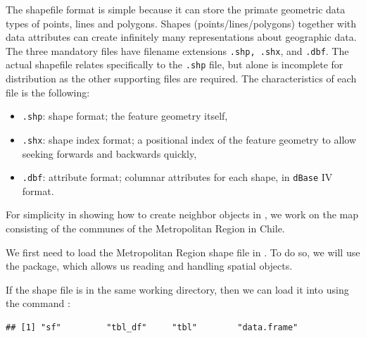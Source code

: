 The shapefile format is simple because it can store the primate geometric data types of points, lines and polygons. Shapes (points/lines/polygons) together with data attributes can create infinitely many representations about geographic data. The three mandatory files have filename extensions \texttt{.shp, .shx}, and \texttt{.dbf}. The actual shapefile relates specifically to the \texttt{.shp} file, but alone is incomplete for distribution as the other supporting files are required. The characteristics of each file is the following:

\begin{itemize}
  \item \texttt{.shp}: shape format; the feature geometry itself,
  \item \texttt{.shx}: shape index format; a positional index of the feature geometry to allow seeking forwards and backwards quickly,
  \item \texttt{.dbf}: attribute format; columnar attributes for each shape, in \texttt{dBase} IV format. 
\end{itemize}

For simplicity in showing how to create neighbor objects in , we work on the map consisting of the communes of the Metropolitan Region in Chile. 

We first need to load the Metropolitan Region shape file in . To do so, we will use the  package, which allows us reading and handling spatial objects. 

\begin{knitrout}
\color{fgcolor}\begin{kframe}
\begin{alltt}
\hlstd{(}\hlstd{)}
\end{alltt}
\end{kframe}
\end{knitrout}

If the shape file  is in the same working directory, then we can load it into  using the command :

\begin{knitrout}
\color{fgcolor}\begin{kframe}
\begin{alltt}
 \hlkwb{<-} \hlstd{(}\hlstd{)}
\end{alltt}
\begin{verbatim}
## [1] "sf"         "tbl_df"     "tbl"        "data.frame"
\end{verbatim}
\end{kframe}
\end{knitrout}

